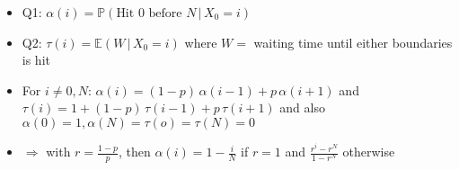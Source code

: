 \documentclass{article}
\begin{document}
\begin{itemize}
\begin{itemize}
		\item Q1: $\alpha(i) = \mathbb{P}(\text{Hit }0\text{ before }N\,|\,X_0 = i)$
		\item Q2: $\tau(i) = \mathbb{E}(W\,|\,X_0=i)$ where $W =$ waiting time until either boundaries is hit
		\item For $i\neq 0,N$: $\alpha(i) = (1-p)\,\alpha(i-1) + p\,\alpha(i+1)$ and $\tau(i) = 1 + (1-p)\,\tau(i-1) + p\,\tau(i+1)$ and also $\alpha(0)=1, \alpha(N) = \tau(o) = \tau(N) = 0$
		\item $\Longrightarrow$ with $r = \frac{1-p}{p}$, then $\alpha(i) = 1 - \frac{i}{N}$ if $r=1$ and $\frac{r^i-r^N}{1-r^N}$ otherwise
	\end{itemize}
\end{itemize}



{\color{blue} }
\end{document}
